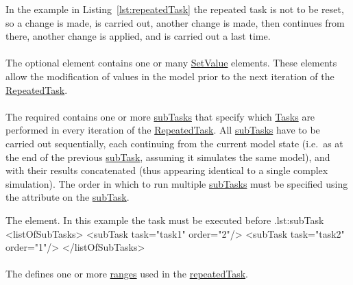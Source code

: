 In the example in  Listing~\ref{lst:repeatedTask} the repeated task is not to be reset, so a change is made,  is carried out, another change is made, then  continues from there, another change is applied, and  is carried out a last time.

\paragraph*{}
\label{sec:changesRepeatedTask}
The optional  element contains one or many \hyperref[class:setValue]{SetValue} elements. These elements allow the modification of values in the model prior to the next iteration of the \hyperref[class:repeatedTask]{RepeatedTask}.

\paragraph*{}
\label{sec:listOfSubTasks}
The required  contains one or more \hyperref[class:subTask]{subTasks} that specify which \hyperref[class:abstractTask]{Tasks} are performed in every iteration of the \hyperref[class:repeatedTask]{RepeatedTask}. All \hyperref[class:subTask]{subTasks} have to be carried out sequentially, each continuing from the current model state (i.e.\ as at the end of the previous \hyperref[class:subTask]{subTask}, assuming it simulates the same model), and with their results concatenated (thus appearing identical to a single complex simulation). The order in which to run multiple \hyperref[class:subTask]{subTasks} must be specified using the \hyperref[sec:subTaskOrder]{} attribute on the \hyperref[class:subTask]{subTask}. 

\begin{myXmlLst}{The  element. In this example the task  must be executed before .}{lst:subTask}
<listOfSubTasks>
	<subTask task="task1" order="2"/> 
	<subTask task="task2" order="1"/> 
</listOfSubTasks>
\end{myXmlLst}

\paragraph*{}
\label{sec:listOfRanges}
The  defines one or more \hyperref[class:range]{ranges} used in the \hyperref[class:repeatedTask]{repeatedTask}.


